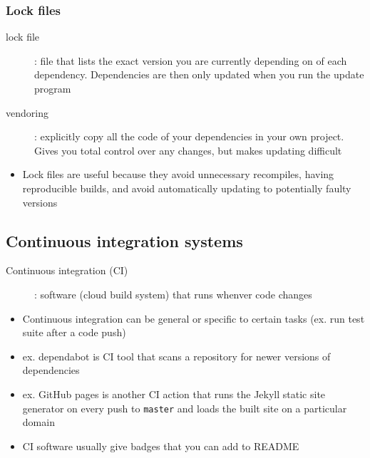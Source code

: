 \documentclass[letterpaper,12pt]{article}
\begin{document}
\subsubsection{Lock files}

\begin{description}
 \item[lock file]: file that lists the exact version you are currently depending on of each dependency. Dependencies are then only updated when you run the update program
 \item[vendoring]: explicitly copy all the code of your dependencies in your own project. Gives you total control over any changes, but makes updating difficult
\end{description}

\begin{itemize}
 \item Lock files are useful because they avoid unnecessary recompiles, having reproducible builds, and avoid automatically updating to potentially faulty versions
\end{itemize}

\subsection{Continuous integration systems}
\begin{description}
 \item[Continuous integration (CI)]: software (cloud build system) that runs whenver code changes
\end{description}

\begin{itemize}
 \item Continuous integration can be general or specific to certain tasks (ex. run test suite after a code push)
 \item ex. dependabot is CI tool that scans a repository for newer versions of dependencies
 \item ex. GitHub pages is another CI action that runs the Jekyll static site generator on every push to \lstinline{master} and loads the built site on a particular domain
 \item CI software usually give badges that you can add to README
\end{itemize}
\end{document}
